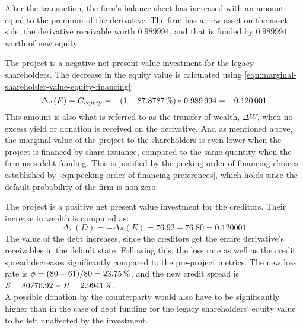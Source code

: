 \documentclass[main.tex]{subfiles}
\begin{document}
        After the transaction, the firm's balance sheet has increased with an amount equal to the premium of the derivative. 
        The firm has a new asset on the asset side, the derivative receivable worth $\num{0.989994}$, and that is funded by $\num{0.989994}$ worth of new equity.

        The project is a negative net present value investment for the legacy shareholders. 
        The decrease in the equity value is calculated using
        \cref{eqn:marginal-shareholder-value-equity-financing}:
        \begin{equation}
                \Delta \pi(E) 
            =  
                G_{\text{equity}}
            =
                - (\num{1} - \pct{0.878787}) * \num{0.989994}
            = 
                -\num{0.120001}
        \end{equation}
        This amount is also what is referred to as the transfer of wealth, $\Delta W$, when no excess yield or donation is received on the derivative. 
        And as mentioned above, the marginal value of the project to the shareholders is even lower when the project is financed by share issuance,
        compared to the same quantity when the firm uses debt funding.
        This is justified by the pecking order of financing choices established by
        \cref{eqn:pecking-order-of-financing-preferences}, 
        which holds since the default probability of the firm is non-zero.

        The project is a positive net present value investment for the creditors. 
        Their increase in wealth is computed as:
        \begin{equation}\label{eqn:wealth-transfer-equality}
            \Delta \pi(D) = -\Delta \pi(E) = \num{76.92} - \num{76.80} = \num{0.120001}
        \end{equation}
        The value of the debt increases, since the creditors get the entire derivative's receivables in the default state. Following this, the loss rate as well as the credit spread decreases significantly compared to the pre-project metrics. The new loss rate is $\phi = (\num{80}-\num{61})/\num{80} = \pct{0.2375}$, and the new credit spread is $S = \num{80}/\num{76.92} - \grossrfrate = \pct{0.029941}$.
        \\
        A possible donation by the counterparty would also have to be significantly higher than in the case of debt funding for the legacy shareholders' equity value to be left unaffected by the investment. 
\end{document}

